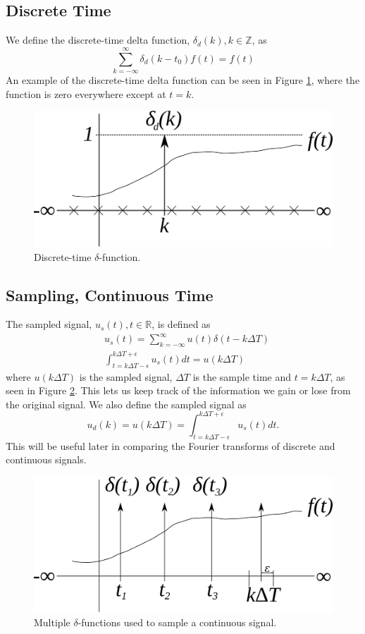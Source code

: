 \documentclass[lecture,12pt,]{pcms-l}
\begin{document}
\subsection{Discrete Time}
We define the discrete-time delta function, $\delta_d(k), k \in \mathbb{Z}$, as
$$\sum_{k=-\infty}^\infty \delta_d(k-t_0)f(t) = f(t)$$
An example of the discrete-time delta function can be seen in Figure \ref{fig:02discDeltaFn}, where the function is zero everywhere except at $t=k$.
\begin{figure}[ht!]
	\centering
	\includegraphics[width=.7\textwidth]{images/02discDeltaFn}
	\caption{Discrete-time $\delta$-function.}
	\label{fig:02discDeltaFn}
\end{figure}

\subsection{Sampling, Continuous Time}
The sampled signal, $u_s(t), t \in \mathbb{R}$, is defined as
\begin{align*}
&u_s(t) = \sum_{k=-\infty}^\infty u(t)\delta(t-k\Delta T) \\
&\int_{t=k\Delta T-\epsilon}^{k\Delta T+\epsilon} u_s(t)dt = u(k\Delta T)
\end{align*}
where $u(k\Delta T)$ is the sampled signal, $\Delta T$ is the sample time and $t=k\Delta T$, as seen in Figure \ref{fig:02samplingDeltaFn}. This lets us keep track of the information we gain or lose from the original signal. We also define the sampled signal as
$$u_d(k) = u(k\Delta T) = \int_{t=k\Delta T-\epsilon}^{k\Delta T+\epsilon} u_s(t)dt.$$
This will be useful later in comparing the Fourier transforms of discrete and continuous signals.
\begin{figure}[ht!]
	\centering
	\includegraphics[width=.7\textwidth]{images/02samplingDeltaFn}
	\caption{Multiple $\delta$-functions used to sample a continuous signal.}
	\label{fig:02samplingDeltaFn}
\end{figure}
\end{document}
